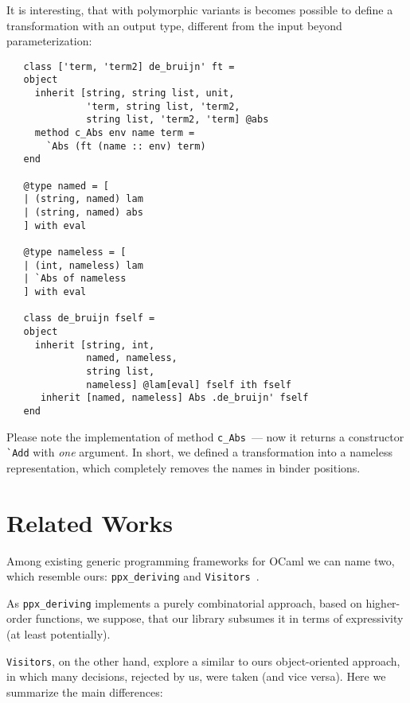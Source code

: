 \documentclass[twocolumn,8pt]{extarticle}
\newcommand{\cd}[1]{\texttt{#1}}
\begin{document}
It is interesting, that with polymorphic variants is becomes possible to define a transformation with an output type, different from the input
beyond parameterization:

\begin{lstlisting}
   class ['term, 'term2] de_bruijn' ft =
   object
     inherit [string, string list, unit,
              'term, string list, 'term2,
              string list, 'term2, 'term] @abs
     method c_Abs env name term =
       `Abs (ft (name :: env) term) 
   end
     
   @type named = [
   | (string, named) lam
   | (string, named) abs
   ] with eval
                     
   @type nameless = [
   | (int, nameless) lam
   | `Abs of nameless
   ] with eval

   class de_bruijn fself =
   object
     inherit [string, int,
              named, nameless,
              string list,
              nameless] @lam[eval] fself ith fself
      inherit [named, nameless] Abs .de_bruijn' fself 
   end
\end{lstlisting}

Please note the implementation of method \lstinline{c_Abs}~--- now it returns a constructor \lstinline{`Add} with \emph{one}
argument. In short, we defined a transformation into a nameless representation, which completely removes the names in binder
positions.

\section{Related Works}

Among existing generic programming frameworks for OCaml we can name two, which resemble ours: \cd{ppx\_deriving} and \cd{Visitors}~\cite{Visitors}.

As \cd{ppx\_deriving} implements a purely combinatorial approach, based on higher-order functions, we suppose, that our library subsumes it in terms
of expressivity (at least potentially).

\cd{Visitors}, on the other hand, explore a similar to ours object-oriented approach, in which many decisions, rejected by us, were taken (and vice versa). Here
we summarize the main differences:
\end{document}
